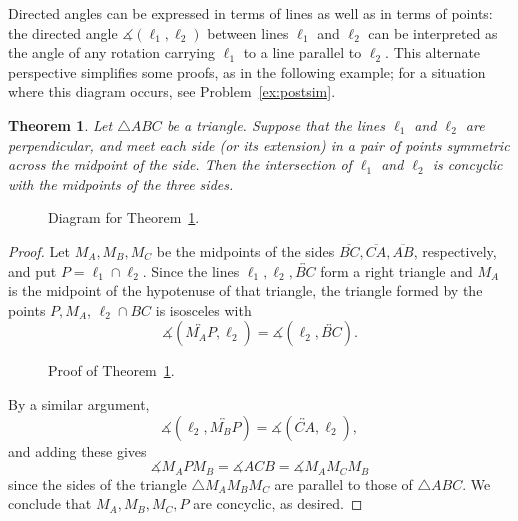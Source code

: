 \documentclass[12pt]{book}
\numberwithin{exc}{section}
\numberwithin{figure}{section}
\newtheorem{theorem}{Theorem}[section]
\numberwithin{equation}{theorem}
\def\dang{\measuredangle} %
\def\line#1{\overleftrightarrow{#1}}
\def\seg#1{\overline{#1}}
\begin{document}
Directed angles can be expressed in terms of lines
as well as in terms of
points: the directed angle $\dang(\ell_1,\ell_2)$
between lines $\ell_1$ and $\ell_2$ can be interpreted as the angle of 
any rotation 
carrying $\ell_1$ to a line parallel to $\ell_2$.
 This alternate perspective simplifies some proofs, as in the 
following example; for a situation where this diagram occurs, see 
Problem~\ref{ex:postsim}.
\begin{theorem} \label{thm:presim}
Let $\triangle ABC$ be a triangle. Suppose that the lines $\ell_{1}$ and 
$\ell_{2}$ are perpendicular, and meet each side (or its extension) in a pair of points 
symmetric across the midpoint of the side. Then the intersection of 
$\ell_{1}$ and $\ell_{2}$ is concyclic with the midpoints of the 
three sides.
\end{theorem}
\begin{figure}[ht]
\caption{Diagram for Theorem~\ref{thm:presim}.}
\end{figure}
\begin{proof}
Let $M_{A}, M_{B}, M_{C}$ be the midpoints of the sides $\seg{BC}, \seg{CA}, 
\seg{AB}$, 
respectively, and put $P = \ell_{1} \cap \ell_{2}$. Since the lines 
$\ell_{1}, \ell_{2}, \line{BC}$ form a right triangle and $M_{A}$ is the 
midpoint of the hypotenuse of that triangle, 
the triangle formed by the points $P, 
M_{A}$, $\ell_{2} \cap BC$ is isosceles with 
\[
\dang(\line{M_{A}P}, \ell_{2}) = \dang(\ell_{2}, \line{BC}).
\]
\begin{figure}[ht]
\caption{Proof of Theorem~\ref{thm:presim}.}
\end{figure}
By a similar argument,
\[
\dang(\ell_{2}, \line{M_{B}P}) = \dang(\line{CA}, \ell_{2}),
\]
and adding these gives
\[
\dang M_{A}P M_{B} = \dang ACB = \dang M_{A}M_{C}M_{B}
\]
since the sides of the triangle $\triangle M_{A}M_{B}M_{C}$ are parallel to 
those of $\triangle ABC$. We conclude that $M_{A}, M_{B}, M_{C}, P$
are concyclic, as desired.
\end{proof}
\end{document}
